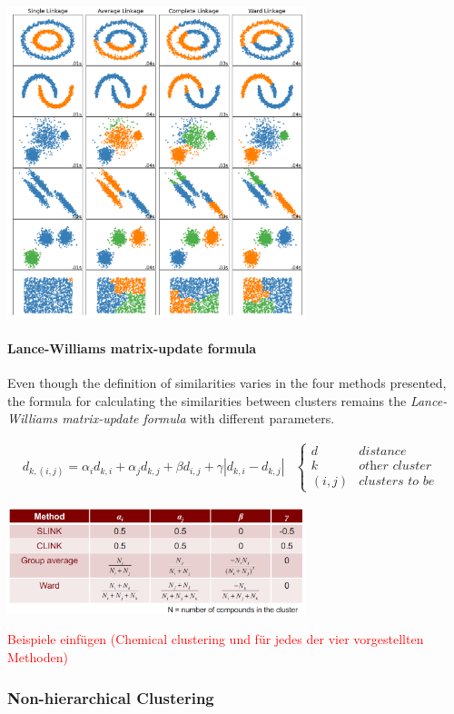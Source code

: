 \begin{center}\includegraphics[width=0.65\textwidth]{img/cheminformatics/ClusteringHierarchicalLinkage.png}\end{center}

\paragraph{Lance-Williams matrix-update formula}
Even though the definition of similarities varies in the four methods presented, the formula for calculating the similarities between clusters remains the \emph{Lance-Williams matrix-update formula} with different parameters.

\begin{align}
    &d_{k,(i,j)}=\alpha_i d_{k,i}+\alpha_j d_{k,j}+\beta d_{i,j}+\gamma|d_{k,i}-d_{k,j}|&\begin{cases}
        d&\textit{distance}\\
        k&\textit{other cluster}\\
        (i,j)&\textit{clusters to be merged}
    \end{cases}
\end{align}

\begin{center}\includegraphics[width=0.65\textwidth]{img/cheminformatics/ClusteringHierarchicalFormulaTable.png}\end{center}

\textcolor{red}{Beispiele einfügen (Chemical clustering und für jedes der vier vorgestellten Methoden)}

\subsubsection{Non-hierarchical Clustering}

